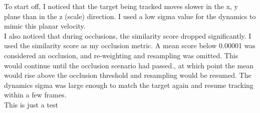 
To start off, I noticed that the target being tracked moves slower in the x, y plane than in the z (scale) direction. I used a low sigma value for the dynamics to mimic this planar velocity.\\

I also noticed that during occlusions, the similarity score dropped significantly. I used the similarity score as my occlusion metric. A mean score below 0.00001 was considered an occlusion, and re-weighting and resampling was omitted. This would continue until the occlusion scenario had passed., at which point the mean would rise above the occlusion threshold and resampling would be resumed. The dynamics sigma was large enough to match the target again and resume tracking within a few frames.\\

This is just a test
